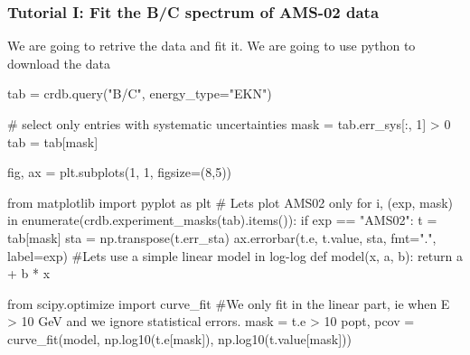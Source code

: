 \documentclass[
  letterpaper,
  DIV=11,
  numbers=noendperiod]{scrreprt}
\newenvironment{Shaded}{\begin{snugshade}}{\end{snugshade}}
\newcommand{\BuiltInTok}[1]{\textcolor[rgb]{0.00,0.23,0.31}{#1}}
\newcommand{\CommentTok}[1]{\textcolor[rgb]{0.37,0.37,0.37}{#1}}
\newcommand{\ControlFlowTok}[1]{\textcolor[rgb]{0.00,0.23,0.31}{#1}}
\newcommand{\DecValTok}[1]{\textcolor[rgb]{0.68,0.00,0.00}{#1}}
\newcommand{\ImportTok}[1]{\textcolor[rgb]{0.00,0.46,0.62}{#1}}
\newcommand{\KeywordTok}[1]{\textcolor[rgb]{0.00,0.23,0.31}{#1}}
\newcommand{\NormalTok}[1]{\textcolor[rgb]{0.00,0.23,0.31}{#1}}
\newcommand{\OperatorTok}[1]{\textcolor[rgb]{0.37,0.37,0.37}{#1}}
\newcommand{\StringTok}[1]{\textcolor[rgb]{0.13,0.47,0.30}{#1}}
\begin{document}
\subsubsection*{Tutorial I: Fit the B/C spectrum of AMS-02
data}\label{tutorial-i-fit-the-bc-spectrum-of-ams-02-data}

We are going to retrive the data and fit it. We are going to use python
to download the data

\begin{Shaded}
\begin{Highlighting}[]
\NormalTok{tab }\OperatorTok{=}\NormalTok{ crdb.query(}\StringTok{"B/C"}\NormalTok{, energy\_type}\OperatorTok{=}\StringTok{"EKN"}\NormalTok{)}

\CommentTok{\# select only entries with systematic uncertainties}
\NormalTok{mask }\OperatorTok{=}\NormalTok{ tab.err\_sys[:, }\DecValTok{1}\NormalTok{] }\OperatorTok{\textgreater{}} \DecValTok{0}
\NormalTok{tab }\OperatorTok{=}\NormalTok{ tab[mask]}

\NormalTok{fig, ax }\OperatorTok{=}\NormalTok{ plt.subplots(}\DecValTok{1}\NormalTok{, }\DecValTok{1}\NormalTok{, figsize}\OperatorTok{=}\NormalTok{(}\DecValTok{8}\NormalTok{,}\DecValTok{5}\NormalTok{))}

\ImportTok{from}\NormalTok{ matplotlib }\ImportTok{import}\NormalTok{ pyplot }\ImportTok{as}\NormalTok{ plt}
\CommentTok{\# Let\textquotesingle{}s plot AMS02 only}
\ControlFlowTok{for}\NormalTok{ i, (exp, mask) }\KeywordTok{in} \BuiltInTok{enumerate}\NormalTok{(crdb.experiment\_masks(tab).items()):}
    \ControlFlowTok{if}\NormalTok{ exp }\OperatorTok{==} \StringTok{"AMS02"}\NormalTok{:}
\NormalTok{        t }\OperatorTok{=}\NormalTok{ tab[mask]}
\NormalTok{        sta }\OperatorTok{=}\NormalTok{ np.transpose(t.err\_sta)}
\NormalTok{        ax.errorbar(t.e, t.value, sta, fmt}\OperatorTok{=}\StringTok{"."}\NormalTok{, label}\OperatorTok{=}\NormalTok{exp)}
\CommentTok{\#Let\textquotesingle{}s use a simple linear model in log{-}log}
\KeywordTok{def}\NormalTok{ model(x, a, b):}
    \ControlFlowTok{return}\NormalTok{ a  }\OperatorTok{+}\NormalTok{ b }\OperatorTok{*}\NormalTok{ x}

\ImportTok{from}\NormalTok{ scipy.optimize }\ImportTok{import}\NormalTok{ curve\_fit}
\CommentTok{\#We only fit in the linear part, ie when E \textgreater{} 10 GeV and we ignore statistical errors. }
\NormalTok{mask }\OperatorTok{=}\NormalTok{ t.e }\OperatorTok{\textgreater{}} \DecValTok{10}
\NormalTok{popt, pcov }\OperatorTok{=}\NormalTok{ curve\_fit(model, np.log10(t.e[mask]), np.log10(t.value[mask]))}


\end{Highlighting}
\end{Shaded}
\end{document}

